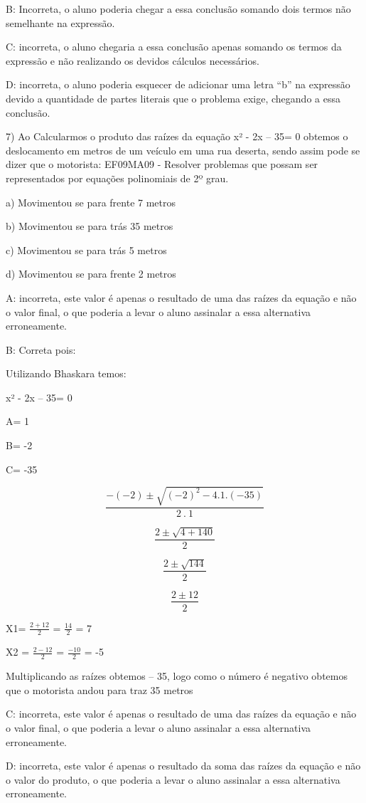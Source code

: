 {B: Incorreta, o aluno poderia chegar a essa conclusão somando dois
termos não semelhante na expressão.

C: incorreta, o aluno chegaria a essa conclusão apenas somando os termos
da expressão e não realizando os devidos cálculos necessários.

D: incorreta, o aluno poderia esquecer de adicionar uma letra ``b'' na
expressão devido a quantidade de partes literais que o problema exige,
chegando a essa conclusão.

7) Ao Calcularmos o produto das raízes da equação x² - 2x -- 35= 0
obtemos o deslocamento em metros de um veículo em uma rua deserta, sendo
assim pode se dizer que o motorista: EF09MA09 - Resolver problemas que
possam ser representados por equações polinomiais de 2º grau.

a) Movimentou se para frente 7 metros

b) Movimentou se para trás 35 metros

c) Movimentou se para trás 5 metros

d) Movimentou se para frente 2 metros

A: incorreta, este valor é apenas o resultado de uma das raízes da
equação e não o valor final, o que poderia a levar o aluno assinalar a
essa alternativa erroneamente.

B: Correta pois:

Utilizando Bhaskara temos:

x² - 2x -- 35= 0

A= 1

B= -2

C= -35

\[\frac{- ( - 2) \pm \sqrt{{( - 2)}^{2} - 4.1.( - 35)}}{2\ .\ 1}\]

\[\frac{2 \pm \sqrt{4 + 140}}{2}\]

\[\frac{2 \pm \sqrt{144}}{2}\]

\[\frac{2 \pm 12}{2}\]

X1= \(\frac{2 + 12}{2}\) = \(\frac{14}{2}\) = 7

X2 = \(\frac{2 - 12}{2}\) = \(\frac{- 10}{2}\) = -5

Multiplicando as raízes obtemos -- 35, logo como o número é negativo
obtemos que o motorista andou para traz 35 metros

C: incorreta, este valor é apenas o resultado de uma das raízes da
equação e não o valor final, o que poderia a levar o aluno assinalar a
essa alternativa erroneamente.

D: incorreta, este valor é apenas o resultado da soma das raízes da
equação e não o valor do produto, o que poderia a levar o aluno
assinalar a essa alternativa erroneamente.

}
